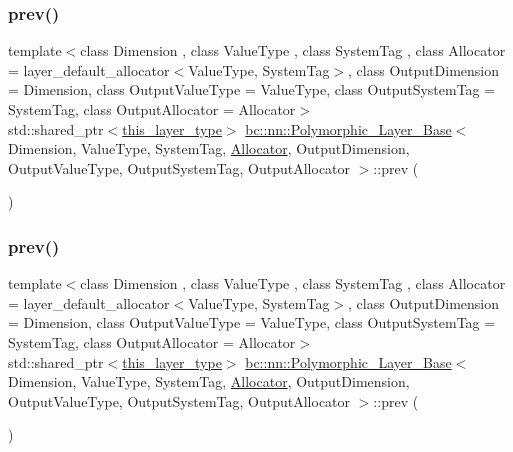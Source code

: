 \subsubsection{\texorpdfstring{prev()}{prev()}\hspace{0.1cm}{\footnotesize\ttfamily [1/4]}}
{\footnotesize\ttfamily template$<$class Dimension , class Value\+Type , class System\+Tag , class Allocator  = layer\+\_\+default\+\_\+allocator$<$\+Value\+Type, System\+Tag$>$, class Output\+Dimension  = Dimension, class Output\+Value\+Type  = Value\+Type, class Output\+System\+Tag  = System\+Tag, class Output\+Allocator  = Allocator$>$ \\
std\+::shared\+\_\+ptr$<$\hyperlink{structbc_1_1nn_1_1Polymorphic__Layer__Base_a6087076d2e0a31e6bbdc2c2039c3ab52}{this\+\_\+layer\+\_\+type}$>$ \hyperlink{structbc_1_1nn_1_1Polymorphic__Layer__Base}{bc\+::nn\+::\+Polymorphic\+\_\+\+Layer\+\_\+\+Base}$<$ Dimension, Value\+Type, System\+Tag, \hyperlink{classbc_1_1allocators_1_1Allocator}{Allocator}, Output\+Dimension, Output\+Value\+Type, Output\+System\+Tag, Output\+Allocator $>$\+::prev (\begin{DoxyParamCaption}{ }\end{DoxyParamCaption})\hspace{0.3cm}{\ttfamily [inline]}}

\mbox{\label{structbc_1_1nn_1_1Polymorphic__Layer__Base_aaecf0bed7f2e610b7b923dbc3d4a81d6}} 
\subsubsection{\texorpdfstring{prev()}{prev()}\hspace{0.1cm}{\footnotesize\ttfamily [2/4]}}
{\footnotesize\ttfamily template$<$class Dimension , class Value\+Type , class System\+Tag , class Allocator  = layer\+\_\+default\+\_\+allocator$<$\+Value\+Type, System\+Tag$>$, class Output\+Dimension  = Dimension, class Output\+Value\+Type  = Value\+Type, class Output\+System\+Tag  = System\+Tag, class Output\+Allocator  = Allocator$>$ \\
std\+::shared\+\_\+ptr$<$\hyperlink{structbc_1_1nn_1_1Polymorphic__Layer__Base_a6087076d2e0a31e6bbdc2c2039c3ab52}{this\+\_\+layer\+\_\+type}$>$ \hyperlink{structbc_1_1nn_1_1Polymorphic__Layer__Base}{bc\+::nn\+::\+Polymorphic\+\_\+\+Layer\+\_\+\+Base}$<$ Dimension, Value\+Type, System\+Tag, \hyperlink{classbc_1_1allocators_1_1Allocator}{Allocator}, Output\+Dimension, Output\+Value\+Type, Output\+System\+Tag, Output\+Allocator $>$\+::prev (\begin{DoxyParamCaption}{ }\end{DoxyParamCaption})\hspace{0.3cm}{\ttfamily [inline]}}

